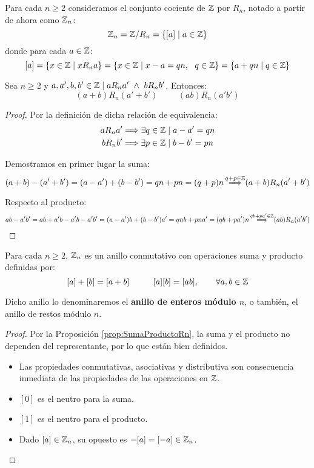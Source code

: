 Para cada $n \geq 2$ consideramos el conjunto cociente de $\mathbb Z$ por $R_n$, notado a partir de ahora como $\mathbb Z_n$:
$$\mathbb Z_n = \mathbb Z/R_n = \{[a] \mid a \in \mathbb Z \}$$
donde para cada $a \in \mathbb Z$:
$$[a] = \{x \in \mathbb Z \mid xR_na \} = \{x \in \mathbb Z \mid x-a = qn,~~q\in \mathbb Z \} = \{a+qn \mid q \in \mathbb Z\}$$

\begin{prop}
    \label{prop:SumaProductoRn}
    Sea $n\geq 2$ y $a,a',b,b' \in \mathbb Z \mid aR_na' \ \land \  bR_nb'$. Entonces:
    $$(a+b)R_n(a'+b') \hspace{1cm} (ab)R_n(a'b')$$
\end{prop}
\begin{proof}
    Por la definición de dicha relación de equivalencia:
    \begin{gather*}
        aR_na' \Longrightarrow \exists q\in \mathbb Z \mid a-a' = qn \\
        bR_nb' \Longrightarrow \exists p\in \mathbb Z \mid b-b' = pn
    \end{gather*}

    Demostramos en primer lugar la suma:
    \begin{equation*}
        (a+b)-(a'+b') = (a-a')+(b-b') = qn + pn = (q+p)n \mathop{\Longrightarrow}^{q+p \in \mathbb Z} (a+b)R_n(a'+b')
    \end{equation*}

    Respecto al producto:
    \begin{equation*}
        ab - a'b' = ab +a'b - a'b - a'b' = (a-a')b + (b-b')a' = qnb +pna' = (qb+pa')n \mathop{\Longrightarrow}^{qb+pa' \in \mathbb Z} (ab)R_n(a'b')
    \end{equation*}
\end{proof}

\begin{teo}
    Para cada $n \geq 2$, $\mathbb Z_n$ es un anillo conmutativo con operaciones suma y producto definidas por:
    $$[a]+[b] = [a+b] \hspace{1cm} [a][b] = [ab],\qquad \forall a,b \in \mathbb Z$$

    Dicho anillo lo denominaremos el \textbf{anillo de enteros módulo $n$}, o también, el anillo de restos módulo $n$.
\end{teo}
\begin{proof}
    Por la Proposición \ref{prop:SumaProductoRn}, la suma y el producto no dependen del representante, por lo que están
    bien definidos.
    \begin{itemize}
        \item Las propiedades conmutativas, asociativas y distributiva son consecuencia inmediata de las propiedades de las operaciones en $\mathbb Z$.
    
        \item $[0]$ es el neutro para la suma.
    
        \item $[1]$ es el neutro para el producto.
    
        \item Dado $[a] \in \mathbb Z_n$, su opuesto es $-[a] = [-a] \in \mathbb Z_n$.
    \end{itemize}    
\end{proof}

